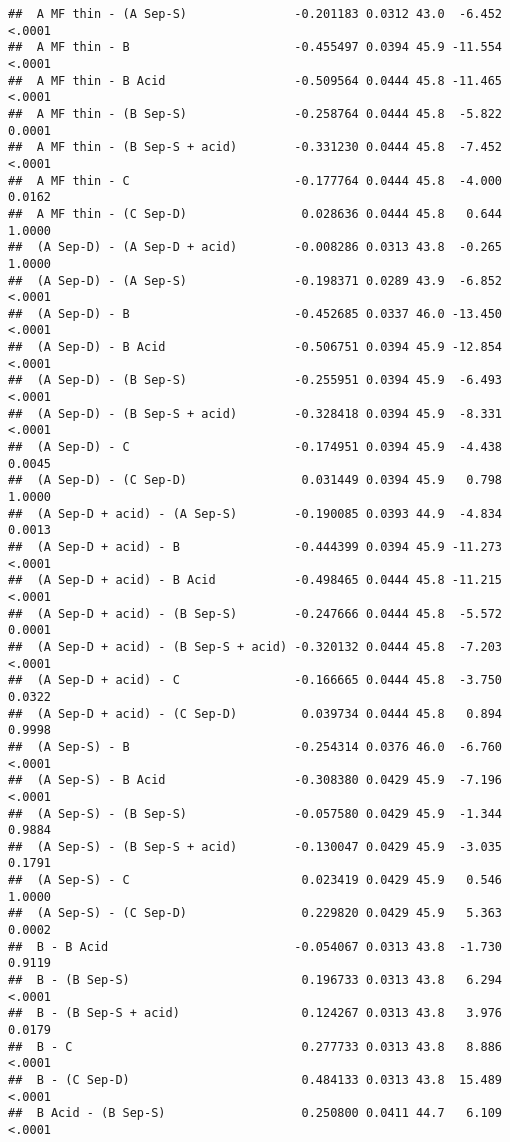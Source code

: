 \documentclass[
]{article}
\begin{document}
\begin{verbatim}
##  A MF thin - (A Sep-S)               -0.201183 0.0312 43.0  -6.452  <.0001
##  A MF thin - B                       -0.455497 0.0394 45.9 -11.554  <.0001
##  A MF thin - B Acid                  -0.509564 0.0444 45.8 -11.465  <.0001
##  A MF thin - (B Sep-S)               -0.258764 0.0444 45.8  -5.822  0.0001
##  A MF thin - (B Sep-S + acid)        -0.331230 0.0444 45.8  -7.452  <.0001
##  A MF thin - C                       -0.177764 0.0444 45.8  -4.000  0.0162
##  A MF thin - (C Sep-D)                0.028636 0.0444 45.8   0.644  1.0000
##  (A Sep-D) - (A Sep-D + acid)        -0.008286 0.0313 43.8  -0.265  1.0000
##  (A Sep-D) - (A Sep-S)               -0.198371 0.0289 43.9  -6.852  <.0001
##  (A Sep-D) - B                       -0.452685 0.0337 46.0 -13.450  <.0001
##  (A Sep-D) - B Acid                  -0.506751 0.0394 45.9 -12.854  <.0001
##  (A Sep-D) - (B Sep-S)               -0.255951 0.0394 45.9  -6.493  <.0001
##  (A Sep-D) - (B Sep-S + acid)        -0.328418 0.0394 45.9  -8.331  <.0001
##  (A Sep-D) - C                       -0.174951 0.0394 45.9  -4.438  0.0045
##  (A Sep-D) - (C Sep-D)                0.031449 0.0394 45.9   0.798  1.0000
##  (A Sep-D + acid) - (A Sep-S)        -0.190085 0.0393 44.9  -4.834  0.0013
##  (A Sep-D + acid) - B                -0.444399 0.0394 45.9 -11.273  <.0001
##  (A Sep-D + acid) - B Acid           -0.498465 0.0444 45.8 -11.215  <.0001
##  (A Sep-D + acid) - (B Sep-S)        -0.247666 0.0444 45.8  -5.572  0.0001
##  (A Sep-D + acid) - (B Sep-S + acid) -0.320132 0.0444 45.8  -7.203  <.0001
##  (A Sep-D + acid) - C                -0.166665 0.0444 45.8  -3.750  0.0322
##  (A Sep-D + acid) - (C Sep-D)         0.039734 0.0444 45.8   0.894  0.9998
##  (A Sep-S) - B                       -0.254314 0.0376 46.0  -6.760  <.0001
##  (A Sep-S) - B Acid                  -0.308380 0.0429 45.9  -7.196  <.0001
##  (A Sep-S) - (B Sep-S)               -0.057580 0.0429 45.9  -1.344  0.9884
##  (A Sep-S) - (B Sep-S + acid)        -0.130047 0.0429 45.9  -3.035  0.1791
##  (A Sep-S) - C                        0.023419 0.0429 45.9   0.546  1.0000
##  (A Sep-S) - (C Sep-D)                0.229820 0.0429 45.9   5.363  0.0002
##  B - B Acid                          -0.054067 0.0313 43.8  -1.730  0.9119
##  B - (B Sep-S)                        0.196733 0.0313 43.8   6.294  <.0001
##  B - (B Sep-S + acid)                 0.124267 0.0313 43.8   3.976  0.0179
##  B - C                                0.277733 0.0313 43.8   8.886  <.0001
##  B - (C Sep-D)                        0.484133 0.0313 43.8  15.489  <.0001
##  B Acid - (B Sep-S)                   0.250800 0.0411 44.7   6.109  <.0001

\end{verbatim}
\end{document}
